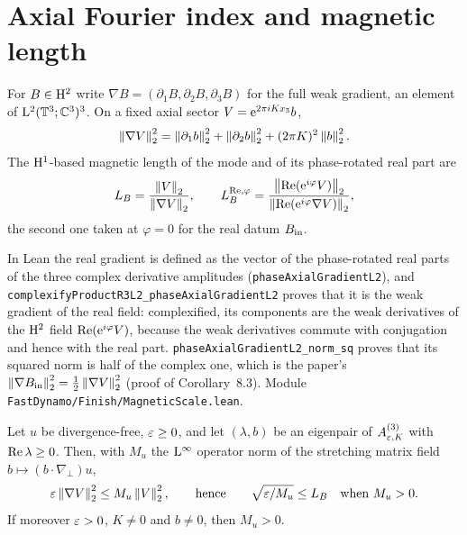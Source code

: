 \section{Axial Fourier index and magnetic length}

\begin{definition}
  \label{def:finish:magnetic-length}
  \leanok
  For $B\in\mathrm{H}^2$ write $\nabla B=(\partial_1B,\partial_2B,\partial_3B)$ for the full weak
  gradient, an element of $\mathrm{L}^2(\mathbb{T}^3;\mathbb{C}^3)^3$.  On a fixed axial sector $V=\mathrm{e}^{2\pi iKx_3}b$,
  \[
    \left\|\nabla V\right\|_2^2
    =\left\|\partial_1b\right\|_2^2+\left\|\partial_2b\right\|_2^2+(2\pi K)^2\left\|b\right\|_2^2 .
  \]
  The $\mathrm{H}^1$-based magnetic length of the mode and of its phase-rotated real part are
  \[
    L_B=\frac{\left\|V\right\|_2}{\left\|\nabla V\right\|_2},
    \qquad
    L_B^{\operatorname{Re},\varphi}
    =\frac{\left\|\operatorname{Re}(\mathrm{e}^{i\varphi}V)\right\|_2}{\left\|\operatorname{Re}(\mathrm{e}^{i\varphi}\nabla V)\right\|_2},
  \]
  the second one taken at $\varphi=0$ for the real datum $B_{\rm in}$.
\end{definition}

In Lean the real gradient is defined as the vector of the phase-rotated real parts of the three
complex derivative amplitudes (\texttt{phaseAxialGradientL2}), and
\texttt{complexifyProductR3L2\_phaseAxialGradientL2} proves that it is the weak gradient of the
real field: complexified, its components are the weak derivatives of the $\mathrm{H}^2$ field
$\operatorname{Re}(\mathrm{e}^{i\varphi}V)$, because the weak derivatives commute with conjugation and hence with
the real part.  \texttt{phaseAxialGradientL2\_norm\_sq} proves that
its squared norm is half of the complex one, which is the paper's
$\left\|\nabla B_{\rm in}\right\|_2^2=\frac12\left\|\nabla V\right\|_2^2$ (proof of Corollary~8.3).  Module
\texttt{FastDynamo/Finish/MagneticScale.lean}.

\begin{lemma}
  \label{lem:finish:magnetic-energy}
  \leanok
  Let $u$ be divergence-free, $\varepsilon\geq0$, and let $(\lambda,b)$ be an eigenpair of
  $A^{(3)}_{\varepsilon,K}$ with $\operatorname{Re}\lambda\geq0$.  Then, with $M_u$ the $\mathrm{L}^\infty$ operator norm of the stretching matrix
  field $b\mapsto(b\cdot\nabla_\perp)u$,
  \[
    \varepsilon\left\|\nabla V\right\|_2^2\leq M_u\left\|V\right\|_2^2,
    \qquad\text{hence}\qquad
    \sqrt{\varepsilon/M_u}\leq L_B\quad\text{when }M_u>0 .
  \]
  If moreover $\varepsilon>0$, $K\neq0$ and $b\neq0$, then $M_u>0$.
\end{lemma}

